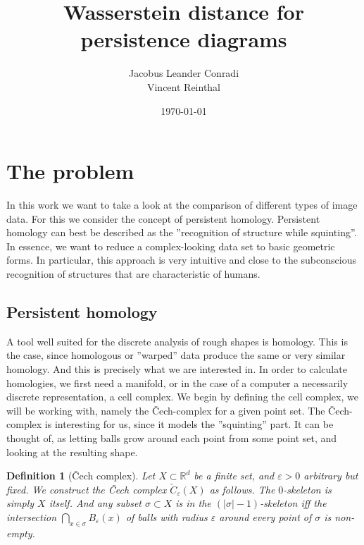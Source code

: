 \documentclass[11pt, a4paper, UKenglish]{article}
\author{Jacobus Leander Conradi\\Vincent Reinthal}
\date{\today}
\title{Wasserstein distance for persistence diagrams}
\newtheorem{definition}{Definition}
\newcommand{\bR}{\mathbb{R}}
\begin{document}
    \maketitle

	
    \thispagestyle{plain}
    \addtocounter{page}{-1}
    \tableofcontents
    \vfil\null
    \clearpage
    \thispagestyle{empty}\mbox{}
    \clearpage

    \section{The problem}\label{sec:the-problem}
    In this work we want to take a look at the comparison of different types of image data.
    For this we consider the concept of persistent homology.
    Persistent homology can best be described as the ''recognition of structure while squinting''.
    In essence, we want to reduce a complex-looking data set to basic geometric forms.
    In particular, this approach is very intuitive and close to the subconscious recognition of structures that are characteristic of humans.


    \subsection{Persistent homology}\label{subsec:persistent-homology}
    A tool well suited for the discrete analysis of rough shapes is homology.
    This is the case, since homologous or ''warped'' data produce the same or very similar homology.
    And this is precisely what we are interested in.
    In order to calculate homologies, we first need a manifold, or in the case of a computer a necessarily discrete representation, a cell complex.
    We begin by defining the cell complex, we will be working with, namely the Čech-complex for a given point set.
    The Čech-complex is interesting for us, since it models the ''squinting'' part.
    It can be thought of, as letting balls grow around each point from some point set, and looking at the resulting shape.

    \begin{definition}[Čech complex]
        Let $X\subset \bR^d$ be a finite set, and $\varepsilon>0$ arbitrary but fixed.
        We construct the Čech complex $\check C_\varepsilon(X)$ as follows.
        The $0$-skeleton is simply $X$ itself.
        And any subset $\sigma\subset X$ is in the $(|\sigma|-1)$-skeleton iff the intersection $\bigcap_{x\in\sigma}B_\varepsilon(x)$ of balls with radius $\varepsilon$ around every point of $\sigma$ is non-empty.
    \end{definition}
\end{document}
